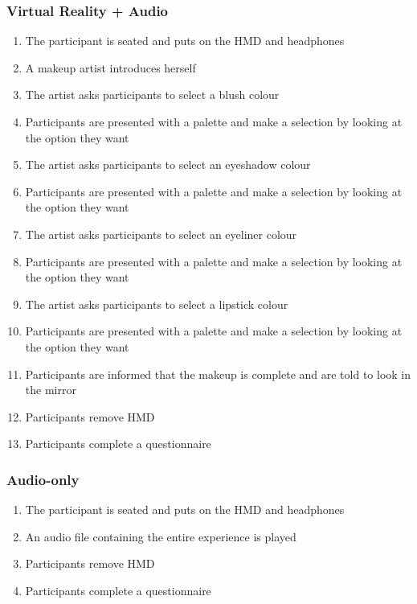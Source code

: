 \documentclass{sigchi}
\begin{document}
\subsubsection{Virtual Reality + Audio}
\begin{enumerate}
\item{The participant is seated and puts on the HMD and headphones}
\item{A makeup artist introduces herself}
\item{The artist asks participants to select a blush colour}
\item{Participants are presented with a palette and make a selection by looking at the option they want}
\item{The artist asks participants to select an eyeshadow colour}
\item{Participants are presented with a palette and make a selection by looking at the option they want}
\item{The artist asks participants to select an eyeliner colour}
\item{Participants are presented with a palette and make a selection by looking at the option they want}
\item{The artist asks participants to select a lipstick colour}
\item{Participants are presented with a palette and make a selection by looking at the option they want}
\item{Participants are informed that the makeup is complete and are told to look in the mirror}
\item{Participants remove HMD}
\item{Participants complete a questionnaire}
\end{enumerate}

\subsubsection{Audio-only}
\begin{enumerate}
\item{The participant is seated and puts on the HMD and headphones}
\item{An audio file containing the entire experience is played}
\item{Participants remove HMD}
\item{Participants complete a questionnaire}
\end{enumerate}

\section{}
\end{document}
